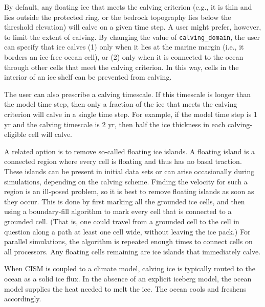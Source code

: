 By default, any floating ice that meets the calving criterion (e.g., it is thin and lies outside the protected ring,
or the bedrock topography lies below the threshold elevation) will calve on a given time step.
A user might prefer, however, to limit the extent of calving.
By changing the value of \texttt{calving\_domain}, the user can specify that ice calves 
(1) only when it lies at the marine margin (i.e., it borders an ice-free ocean cell), or 
(2) only when it is connected to the ocean through other cells that meet the calving criterion.
In this way, cells in the interior of an ice shelf can be prevented from calving.

The user can also prescribe a calving timescale. If this timescale is longer than the model time step,
then only a fraction of the ice that meets the calving criterion will calve in a single time step.
For example, if the model time step is 1 yr and the calving timescale is 2 yr, then half the
ice thickness in each calving-eligible cell will calve.

A related option is to remove so-called floating ice islands.  A floating island is a connected region
where every cell is floating and thus has no basal traction.  These islands can be present in initial
data sets or can arise occasionally during simulations, depending on the
calving scheme.  Finding the velocity for such a region is an ill-posed problem, so it is best
to remove floating islands as soon as they occur. This is done by first marking all the grounded ice cells,
and then using a boundary-fill algorithm to mark every cell that is connected to a grounded cell.
(That is, one could travel from a grounded cell to the cell in question along a path at least
one cell wide, without leaving the ice pack.) For parallel simulations, the algorithm is repeated enough times
to connect cells on all processors. Any floating cells remaining are ice islands that immediately calve.

When CISM is coupled to a climate model, calving ice is typically routed to the ocean as a solid ice flux.
In the absence of an explicit iceberg model, the ocean model supplies the heat needed to melt the ice.
The ocean cools and freshens accordingly.
